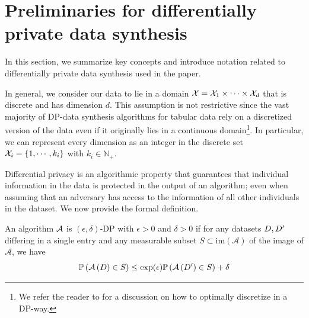 \section{Preliminaries for differentially private data synthesis}
In this section, we summarize key concepts and introduce notation related to differentially private data synthesis used in the paper. 

In general, we consider our data to lie in a domain $\mathcal X= \mathcal X_1 \times  \cdots \times \mathcal X_d$ that is discrete and has dimension $d$.
This assumption is not restrictive since the vast majority of DP-data synthesis algorithms for tabular data rely on a discretized version of the data even if it originally lies in a continuous domain\footnote{We refer the reader to \citep{zhang2016privtree} for a discussion on how to optimally discretize in a DP-way.}. In particular, we can represent every dimension as an integer in the discrete set $\mathcal X_{i} = \{1, \cdots, k_i\}$ with $k_i \in \mathbb N_+$.

Differential privacy \citep{dp} is an algorithmic property that guarantees that individual information in the data is protected in the output of an algorithm; even when assuming that an adversary has access to the information of all other individuals in the dataset. We now provide the formal definition.

\begin{definition}
\label{eq:defdp}
    An algorithm ${\mathcal{A}}$ is $(\epsilon,\delta)$-DP with $\epsilon>0$ and $\delta>0$ if for any datasets $D, D'$
    differing in a single entry and any measurable subset $S \subset \mathrm{im}(\mathcal A)$ of the image of $\mathcal A$, we have
\begin{equation*}
  \mathbb{P}\left(\mathcal A\left(D\right)\in S\right) \leq \exp(\epsilon) \mathbb{P}\left(\mathcal A\left(D'\right)\in S\right) + \delta
\end{equation*}
\end{definition}

